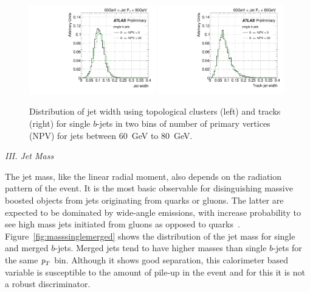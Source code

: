 \begin{figure}[tp]
\centering
\includegraphics[width=0.49\textwidth]{FIGS/systematics/Widthsingle_060.pdf}
\includegraphics[width=0.49\textwidth]{FIGS/systematics/trkWidthsingle_060.pdf}
\caption{Distribution of jet width using topological clusters (left) and tracks (right) for single $b$-jets in two bins of number of primary vertices (NPV) for jets between 60~GeV to 80~GeV.}
\label{fig:trkwidthpileup}
\end{figure}

{ \em III. Jet Mass}
\vspace{3 mm}

The jet mass, like the linear radial moment, also depends on the radiation pattern of the event. It is the most basic observable for disinguishing massive boosted objects from jets originating from quarks or gluons. The latter are expected to be dominated by wide-angle emissions, with increase probability to see high mass jets initiated from gluons as opposed to quarks~\cite{PhysRevD.79.074012}.  
Figure~\ref{fig:masssinglemerged} shows the distribution of the jet mass for single and merged $b$-jets. Merged jets tend to have higher masses than single $b$-jets for the same ${\emph{p}_{T}}$ bin. Although it shows good separation, this calorimeter based variable is susceptible to the amount of pile-up in the event and for this it is not a robust discriminator.
\vspace{3 mm}

